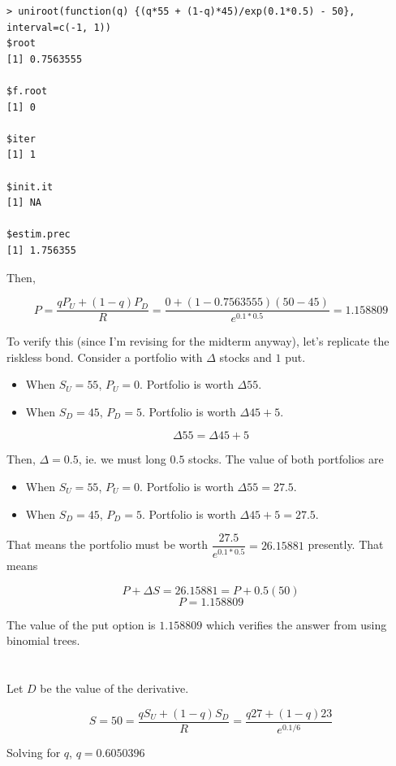 \documentclass[11pt]{scrartcl}
\begin{document}
\begin{lstlisting}
> uniroot(function(q) {(q*55 + (1-q)*45)/exp(0.1*0.5) - 50}, interval=c(-1, 1))
$root
[1] 0.7563555

$f.root
[1] 0

$iter
[1] 1

$init.it
[1] NA

$estim.prec
[1] 1.756355
\end{lstlisting}

Then,

\[P = \frac{qP_U + (1-q)P_D}{R} = \frac{0 + (1-0.7563555)(50-45)}{e^{0.1*0.5}} = 1.158809\]

To verify this (since I'm revising for the midterm anyway), let's replicate the riskless bond. Consider a portfolio with $\Delta$ stocks and $1$ put.

\begin{itemize}
\item When $S_U = 55$, $P_U = 0$. Portfolio is worth $\Delta 55$.
\item When $S_D = 45$, $P_D = 5$. Portfolio is worth $\Delta 45 + 5$.
\end{itemize}

\[\Delta 55 = \Delta 45 + 5\]

Then, $\Delta = 0.5$, ie. we must long $0.5$ stocks. The value of both portfolios are

\begin{itemize}
\item When $S_U = 55$, $P_U = 0$. Portfolio is worth $\Delta 55 = 27.5$.
\item When $S_D = 45$, $P_D = 5$. Portfolio is worth $\Delta 45 + 5 = 27.5$.
\end{itemize}

That means the portfolio must be worth $\dfrac{27.5}{e^{0.1*0.5}} = 26.15881$ presently. That means

\[P + \Delta S = 26.15881 = P + 0.5(50)\]
\[P = 1.158809\]

The value of the put option is $1.158809$ which verifies the answer from using binomial trees.

\section{}

Let $D$ be the value of the derivative.

\[S = 50 = \frac{qS_U + (1-q)S_D}{R} = \frac{q27 + (1-q)23}{e^{0.1/6}}\]

Solving for $q$, $q = 0.6050396$
\end{document}
